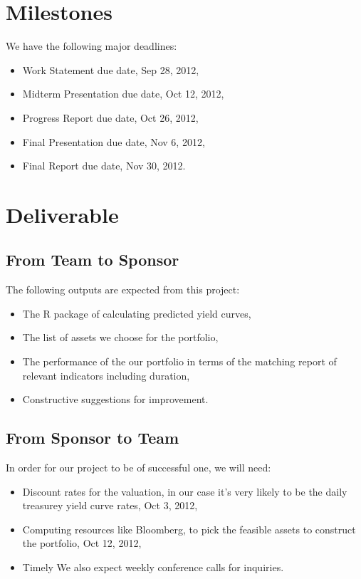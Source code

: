 \documentclass[12pt,letterpaper]{article}
\theoremstyle{definition}
\begin{document}
\section{Milestones}
We have the following major deadlines:
\begin{itemize}
    \item Work Statement due date, Sep 28, 2012,
    \item Midterm Presentation due date, Oct 12, 2012,
    \item Progress Report due date, Oct 26, 2012,
    \item Final Presentation due date, Nov 6, 2012,
    \item Final Report due date, Nov 30, 2012.
\end{itemize}


\section{Deliverable}
\subsection{From Team to Sponsor} %
The following outputs are expected from this project:
\begin{itemize}
    \item The R package of calculating predicted yield curves,
    \item The list of assets we choose for the portfolio,
    \item The performance of the our portfolio in terms of the matching report of relevant indicators including duration,
    \item Constructive suggestions for improvement.
\end{itemize}

\subsection{From Sponsor to Team} %

In order for our project to be of successful one, we will need:
\begin{itemize}
    \item Discount rates for the valuation, in our case it's very likely to be the daily treasurey yield curve rates,  Oct 3, 2012,
    \item Computing resources like Bloomberg, to pick the feasible assets to construct the portfolio, Oct 12, 2012,
    \item Timely We also expect weekly conference calls for inquiries.
\end{itemize}
\end{document}
